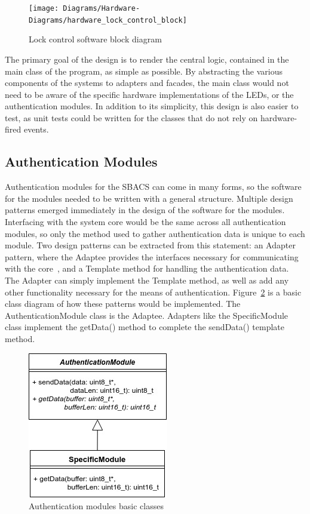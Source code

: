 \documentclass[12pt]{report}
\let\Oldsubsection\subsection
\renewcommand{\subsection}{\FloatBarrier\Oldsubsection}
\begin{document}
\begin{figure}
    \texttt{[image: Diagrams/Hardware-Diagrams/hardware\_lock\_control\_block]}
    \caption{Lock control software block diagram}
    \label{fig:hardware-lock-control-block}
\end{figure}

The primary goal of the design is to render the central logic, contained in the main class of the program, as simple as 
possible. By abstracting the various components of the systems to adapters and facades, the main class would not need 
to be aware of the specific hardware implementations of the LEDs, or the authentication modules. In addition to its 
simplicity, this design is also easier to test, as unit tests could be written for the classes that do not rely on 
hardware-fired events.


\subsection{Authentication Modules} \label{authentication-modules}

Authentication modules for the SBACS can come in many forms, so the software for the modules needed to be written with 
a general structure. Multiple design patterns emerged immediately in the design of the software for the modules. 
Interfacing with the system core would be the same across all authentication modules, so only the method used to gather 
authentication data is unique to each module. Two design patterns can be extracted from this statement: an Adapter 
pattern, where the Adaptee provides the interfaces necessary for communicating with the 
core~\autocite{DESIGNPATTERNSGOF}, and a Template method for 
handling the authentication data. The Adapter can simply implement the Template method, as well as add any other 
functionality necessary for the means of authentication. Figure~\ref{fig:modules-start} is a basic class diagram of how 
these patterns would be implemented. The AuthenticationModule class is the Adaptee. Adapters like the SpecificModule 
class implement the getData() method to complete the sendData() template method.

\begin{figure}
    \centering
    \includegraphics{Diagrams/Hardware-Diagrams/modules_start}
    \caption{Authentication modules basic classes}
    \label{fig:modules-start}
\end{figure}
\end{document}
